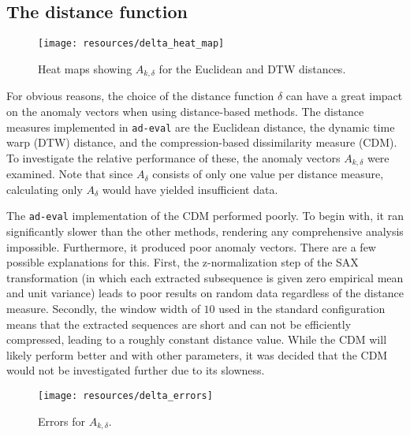 \subsection{The distance function}
\FloatBarrier{}

\begin{figure}[ht]
    \vspace{-20pt}
    \begin{center}
        \texttt{[image: resources/delta\_heat\_map]}
    \end{center}
    \vspace{-20pt}
    \caption{\small{Heat maps showing $A_{k, \delta}$ for the Euclidean and DTW distances.}}
    \vspace{-10pt}
\label{fig:delta_heat_map}
\end{figure}

For obvious reasons, the choice of the distance function $\delta$ can have a great impact on the anomaly vectors when using distance-based methods. The distance measures implemented in \texttt{ad-eval} are the Euclidean distance, the dynamic time warp (DTW) distance, and the compression-based dissimilarity measure (CDM). To investigate the relative performance of these, the anomaly vectors $A_{k, \delta}$ were examined. Note that since $A_{\delta}$ consists of only one value per distance measure, calculating only $A_\delta$ would have yielded insufficient data.

The \texttt{ad-eval} implementation of the CDM performed poorly. To begin with, it ran significantly slower than the other methods, rendering any comprehensive analysis impossible. Furthermore, it produced poor anomaly vectors. There are a few possible explanations for this. First, the z-normalization step of the SAX transformation (in which each extracted subsequence is given zero empirical mean and unit variance) leads to poor results on random data regardless of the distance measure. Secondly, the window width of $10$ used in the standard configuration means that the extracted sequences are short and can not be efficiently compressed, leading to a roughly constant distance value. While the CDM will likely perform better and with other parameters, it was decided that the CDM would not be investigated further due to its slowness.

\begin{wrapfigure}{r}{0.5\textwidth}
    \vspace{-30pt}
    \begin{center}
        \texttt{[image: resources/delta\_errors]}
    \end{center}
    \vspace{-20pt}
    \caption{\small{Errors for $A_{k, \delta}$.}}
    \vspace{-10pt}
\label{fig:delta_errors}
\end{wrapfigure}

